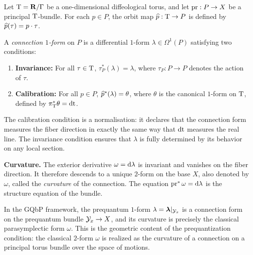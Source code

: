 \documentclass[10pt,reqno,letterpaper,twoside]{amsbook}
\begin{document}
  \begin{article}
    \label{art:Connections on Torus Principal Bundles}
    
    Let $\mathrm{T} = {\mathbf{R}}/\Gamma$ be a one-dimensional diffeological torus,
    and let $\pr: P \to X$ be a principal $\mathrm{T}$-bundle.
    For each $p \in P$,
    the orbit map $\widehat{p}: \mathrm{T} \to P$ is defined by
    $\widehat{p}(\tau) = p \cdot \tau$.
    
    \begin{definition}
      A \emph{connection $1$-form} on $P$ is a differential $1$-form
      $\lambda \in \Omega^1(P)$ satisfying two conditions:
      \begin{enumerate}
        \item \textbf{Invariance:}
        For all $\tau \in \mathrm{T}$,
        $\tau_P^*(\lambda) = \lambda$,
        where $\tau_P: P \to P$ denotes the action of $\tau$.
        \item \textbf{Calibration:}
        For all $p \in P$,
        $\widehat{p}^*(\lambda) = \theta$,
        where $\theta$ is the canonical $1$-form on $\mathrm{T}$,
        defined by $\pi_{\mathrm{T}}^*\theta = \mathrm{dt}$.
      \end{enumerate}
    \end{definition}
    
    The calibration condition is a normalisation:
    it declares that the connection form measures the fiber direction
    in exactly the same way that $\mathrm{dt}$ measures the real line.
    The invariance condition ensures that $\lambda$ is fully determined
    by its behavior on any local section.
    
    \medskip
    \noindent
    \textbf{Curvature.}
    The exterior derivative $\omega = \mathrm{d}\lambda$ is invariant
    and vanishes on the fiber direction.
    It therefore descends to a unique $2$-form on the base $X$,
    also denoted by $\omega$,
    called the \emph{curvature} of the connection.
    The equation $\pr^*\omega = \der\lambda$ is the structure equation
    of the bundle.
    
    In the GQbP framework,
    the prequantum $1$-form $\lambda = \boldsymbol \lambda|_{\mathcal{Y}_x}$ is a connection form
    on the prequantum bundle $\mathcal{Y}_x \to X$,
    and its curvature is precisely the classical parasymplectic form $\omega$.
    This is the geometric content of the prequantization condition:
    the classical $2$-form $\omega$ is realized as the curvature of a connection
    on a principal torus bundle over the space of motions.
  \end{article}
  
\end{document}
